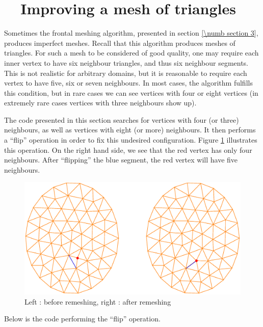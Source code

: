 \section{~~Improving a mesh of triangles}\label{\numb section 10.\numb parag 4}

Sometimes the frontal meshing algorithm, presented in section \ref{\numb section 3},
produces imperfect meshes.
Recall that this algorithm produces meshes of triangles.
For such a mesh to be considered of good quality, one may require each inner vertex
to have six neighbour triangles, and thus six neighbour segments.
This is not realistic for arbitrary domains, but it is reasonable to require each vertex
to have five, six or seven neighbours.
In most cases, the algorithm fulfills this condition, but in rare cases we can see vertices
with four or eight vertices (in extremely rare cases vertices with three neighbours show up).

The code presented in this section searches for vertices with four (or three) neighbours,
as well as vertices with eight (or more) neighbours.
It then performs a ``flip'' operation in order to fix this undesired configuration.
Figure \ref{\numb section 10.\numb fig 2} illustrates this operation.
On the right hand side, we see that the red vertex has only four neighbours.
After ``flipping'' the blue segment, the red vertex will have five neighbours.

\begin{figure}[ht] \centering
  \includegraphics[width=127mm]{two-ellipses}
  \caption{Left : before remeshing, right : after remeshing}
  \label{\numb section 10.\numb fig 2}
\end{figure}

Below is the code performing the ``flip'' operation.

